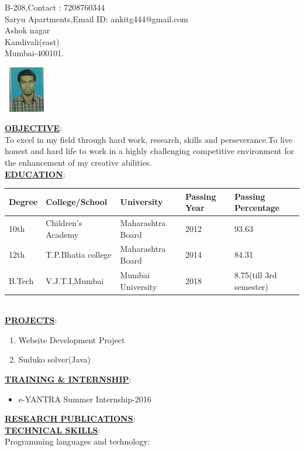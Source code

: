 \documentclass[a4paper,12pt]{article}
\begin{document}
\noindent\makebox[\linewidth]{\rule{170mm}{0.4pt}}
\begin{flushleft}
{B-208,\hfill{Contact : 7208760344} \\ Saryu Apartments,\hfill{Email ID: ankitg444@gmail.com}\\Ashok nagar\\Kandivali(east) \\Mumbai-400101.}
\end{flushleft}
\hfill\includegraphics[width=20mm,height=20mm]{Untitled}\\[1cm]
\begin{flushleft}

\underline{\textbf{OBJECTIVE}}:\\
To excel in my field through hard work, research, skills and perseverance.To live honest and hard life to work in a highly challenging competitive environment for the enhancement of my creative abilities.\\[0.5cm]

\underline{\textbf{EDUCATION}}:\\[0.5cm]
\begin{tabular}{ | m{2.5cm} | m{3cm}| m{2.5cm} | m{2.5cm}| m{3cm} | } 
\hline
Degree& College/School & University & Passing Year & Passing Percentage \\ 
\hline
10th & Children's Academy & Maharashtra Board & 2012 & 93.63 \\ 
\hline
12th & T.P.Bhatia college & Maharashtra Board & 2014 &84.31 \\ 
\hline
B.Tech & V.J.T.I,Mumbai & Mumbai University &2018 & 8.75(till 3rd semester) \\
\hline
\end{tabular}\\[0.5cm]
\underline{\textbf{PROJECTS}}:\\[0.5cm]
\begin{enumerate}
    \item {Website Development Project }
    \item{Suduko solver(Java)}
\end{enumerate}
\underline{\textbf{TRAINING \& INTERNSHIP}}:\\[0.5cm]
\begin{itemize}
 \item{e-YANTRA Summer Internship-2016}
\end{itemize}
\underline{\textbf{RESEARCH PUBLICATIONS}}:\\[0.5cm]
\underline{\textbf{TECHNICAL SKILLS}}:\\[0.5cm]
Programming languages and technology:


\end{flushleft}
\end{document}
